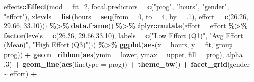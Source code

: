 \documentclass[
]{article}
\newenvironment{Shaded}{\begin{snugshade}}{\end{snugshade}}
\newcommand{\AttributeTok}[1]{\textcolor[rgb]{0.13,0.29,0.53}{#1}}
\newcommand{\DecValTok}[1]{\textcolor[rgb]{0.00,0.00,0.81}{#1}}
\newcommand{\FloatTok}[1]{\textcolor[rgb]{0.00,0.00,0.81}{#1}}
\newcommand{\FunctionTok}[1]{\textcolor[rgb]{0.13,0.29,0.53}{\textbf{#1}}}
\newcommand{\NormalTok}[1]{#1}
\newcommand{\SpecialCharTok}[1]{\textcolor[rgb]{0.81,0.36,0.00}{\textbf{#1}}}
\newcommand{\StringTok}[1]{\textcolor[rgb]{0.31,0.60,0.02}{#1}}
\begin{document}
\begin{Shaded}
\begin{Highlighting}[]
\NormalTok{effects}\SpecialCharTok{::}\FunctionTok{Effect}\NormalTok{(}\AttributeTok{mod =}\NormalTok{ fit\_2,}
                \AttributeTok{focal.predictors =} \FunctionTok{c}\NormalTok{(}\StringTok{"prog"}\NormalTok{, }\StringTok{"hours"}\NormalTok{, }
                                     \StringTok{"gender"}\NormalTok{, }\StringTok{"effort"}\NormalTok{),}
                \AttributeTok{xlevels =} \FunctionTok{list}\NormalTok{(}\AttributeTok{hours =} \FunctionTok{seq}\NormalTok{(}\AttributeTok{from =} \DecValTok{0}\NormalTok{,}
                                           \AttributeTok{to =} \DecValTok{4}\NormalTok{,}
                                           \AttributeTok{by =}\NormalTok{ .}\DecValTok{1}\NormalTok{),}
                               \AttributeTok{effort =} \FunctionTok{c}\NormalTok{(}\FloatTok{26.26}\NormalTok{, }\FloatTok{29.66}\NormalTok{, }\FloatTok{33.10}\NormalTok{))) }\SpecialCharTok{\%\textgreater{}\%} 
  \FunctionTok{data.frame}\NormalTok{() }\SpecialCharTok{\%\textgreater{}\%} 
\NormalTok{  dplyr}\SpecialCharTok{::}\FunctionTok{mutate}\NormalTok{(}\AttributeTok{effort =}\NormalTok{ effort }\SpecialCharTok{\%\textgreater{}\%} 
                  \FunctionTok{factor}\NormalTok{(}\AttributeTok{levels =} \FunctionTok{c}\NormalTok{(}\FloatTok{26.26}\NormalTok{, }\FloatTok{29.66}\NormalTok{,}\FloatTok{33.10}\NormalTok{),}
                         \AttributeTok{labels =} \FunctionTok{c}\NormalTok{(}\StringTok{"Low Effort (Q1)"}\NormalTok{,}
                                    \StringTok{"Avg Effort (Mean)"}\NormalTok{,}
                                    \StringTok{"High Effort (Q3)"}\NormalTok{))) }\SpecialCharTok{\%\textgreater{}\%} 
  \FunctionTok{ggplot}\NormalTok{(}\FunctionTok{aes}\NormalTok{(}\AttributeTok{x =}\NormalTok{ hours,}
             \AttributeTok{y =}\NormalTok{ fit,}
             \AttributeTok{group =}\NormalTok{ prog)) }\SpecialCharTok{+}
  \FunctionTok{geom\_ribbon}\NormalTok{(}\FunctionTok{aes}\NormalTok{(}\AttributeTok{ymin =}\NormalTok{ lower,}
                  \AttributeTok{ymax =}\NormalTok{ upper,}
                  \AttributeTok{fill =}\NormalTok{ prog),}
              \AttributeTok{alpha =}\NormalTok{ .}\DecValTok{3}\NormalTok{) }\SpecialCharTok{+}
  \FunctionTok{geom\_line}\NormalTok{(}\FunctionTok{aes}\NormalTok{(}\AttributeTok{linetype =}\NormalTok{ prog)) }\SpecialCharTok{+}
  \FunctionTok{theme\_bw}\NormalTok{() }\SpecialCharTok{+}
  \FunctionTok{facet\_grid}\NormalTok{(gender }\SpecialCharTok{\textasciitilde{}}\NormalTok{ effort) }\SpecialCharTok{+}

\end{Highlighting}
\end{Shaded}
\end{document}

